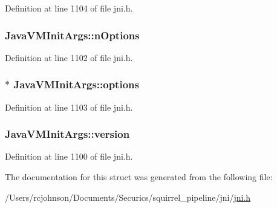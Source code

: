 Definition at line 1104 of file jni.\-h.

\hypertarget{struct_java_v_m_init_args_ab1714d891a0164be1a2a043e2f9f801b}{
\subsubsection[{n\-Options}]{ Java\-V\-M\-Init\-Args\-::n\-Options}}\label{struct_java_v_m_init_args_ab1714d891a0164be1a2a043e2f9f801b}


Definition at line 1102 of file jni.\-h.

\hypertarget{struct_java_v_m_init_args_ae72105011c3bed16180578f7ba0eb3fa}{
\subsubsection[{options}]{$\ast$ Java\-V\-M\-Init\-Args\-::options}}\label{struct_java_v_m_init_args_ae72105011c3bed16180578f7ba0eb3fa}


Definition at line 1103 of file jni.\-h.

\hypertarget{struct_java_v_m_init_args_a90ab88849e2299bd2989287542bb214d}{
\subsubsection[{version}]{ Java\-V\-M\-Init\-Args\-::version}}\label{struct_java_v_m_init_args_a90ab88849e2299bd2989287542bb214d}


Definition at line 1100 of file jni.\-h.



The documentation for this struct was generated from the following file\-:\begin{DoxyCompactItemize}
\item 
/\-Users/rcjohnson/\-Documents/\-Securics/squirrel\-\_\-pipeline/jni/\hyperlink{jni_8h}{jni.\-h}\end{DoxyCompactItemize}
